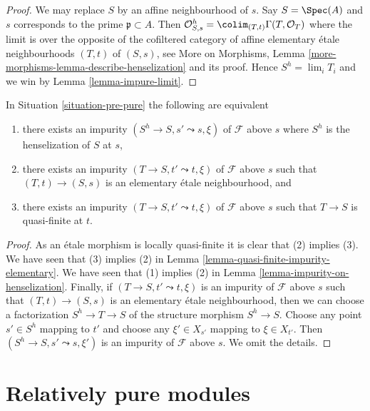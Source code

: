 \begin{proof}
We may replace $S$ by an affine neighbourhood of $s$.
Say $S = \Spec(A)$ and $s$ corresponds to the prime
$\mathfrak p \subset A$. Then
$\mathcal{O}_{S, s}^h = \colim_{(T, t)} \Gamma(T, \mathcal{O}_T)$
where the limit is over the opposite of the
cofiltered category of affine elementary \'etale neighbourhoods
$(T, t)$ of $(S, s)$, see
More on Morphisms,
Lemma \ref{more-morphisms-lemma-describe-henselization}
and its proof. Hence $S^h = \lim_i T_i$ and we win by
Lemma \ref{lemma-impure-limit}.
\end{proof}

\begin{lemma}
\label{lemma-pure-along-X-s}
In Situation \ref{situation-pre-pure} the following
are equivalent
\begin{enumerate}
\item there exists an impurity $(S^h \to S, s' \leadsto s, \xi)$
of $\mathcal{F}$ above $s$ where $S^h$ is the henselization of $S$ at $s$,
\item there exists an impurity $(T \to S, t' \leadsto t, \xi)$
of $\mathcal{F}$ above $s$ such that $(T, t) \to (S, s)$ is an
elementary \'etale neighbourhood, and
\item there exists an impurity $(T \to S, t' \leadsto t, \xi)$
of $\mathcal{F}$ above $s$ such that $T \to S$ is quasi-finite at $t$.
\end{enumerate}
\end{lemma}

\begin{proof}
As an \'etale morphism is locally quasi-finite it is clear that
(2) implies (3). We have seen that (3) implies (2) in
Lemma \ref{lemma-quasi-finite-impurity-elementary}.
We have seen that (1) implies (2) in
Lemma \ref{lemma-impurity-on-henselization}.
Finally, if $(T \to S, t' \leadsto t, \xi)$ is an impurity
of $\mathcal{F}$ above $s$ such that $(T, t) \to (S, s)$ is an
elementary \'etale neighbourhood, then we can choose a factorization
$S^h \to T \to S$ of the structure morphism $S^h \to S$.
Choose any point $s' \in S^h$ mapping to $t'$ and choose any
$\xi' \in X_{s'}$ mapping to $\xi \in X_{t'}$. Then
$(S^h \to S, s' \leadsto s, \xi')$ is an impurity of
$\mathcal{F}$ above $s$. We omit the details.
\end{proof}





\section{Relatively pure modules}
\label{section-pure}

